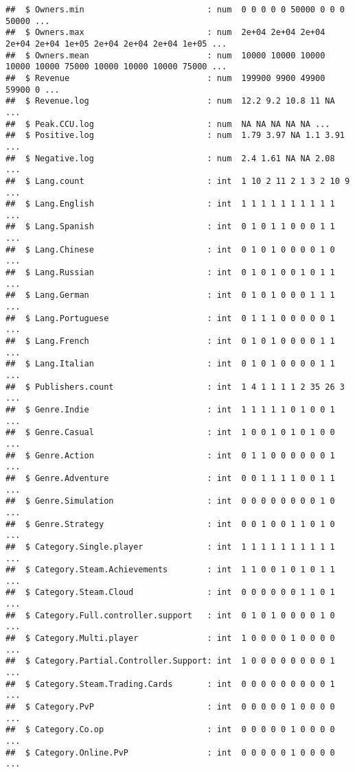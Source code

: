 \documentclass[
]{article}
\begin{document}
\begin{verbatim}
##  $ Owners.min                         : num  0 0 0 0 0 50000 0 0 0 50000 ...
##  $ Owners.max                         : num  2e+04 2e+04 2e+04 2e+04 2e+04 1e+05 2e+04 2e+04 2e+04 1e+05 ...
##  $ Owners.mean                        : num  10000 10000 10000 10000 10000 75000 10000 10000 10000 75000 ...
##  $ Revenue                            : num  199900 9900 49900 59900 0 ...
##  $ Revenue.log                        : num  12.2 9.2 10.8 11 NA ...
##  $ Peak.CCU.log                       : num  NA NA NA NA NA ...
##  $ Positive.log                       : num  1.79 3.97 NA 1.1 3.91 ...
##  $ Negative.log                       : num  2.4 1.61 NA NA 2.08 ...
##  $ Lang.count                         : int  1 10 2 11 2 1 3 2 10 9 ...
##  $ Lang.English                       : int  1 1 1 1 1 1 1 1 1 1 ...
##  $ Lang.Spanish                       : int  0 1 0 1 1 0 0 0 1 1 ...
##  $ Lang.Chinese                       : int  0 1 0 1 0 0 0 0 1 0 ...
##  $ Lang.Russian                       : int  0 1 0 1 0 0 1 0 1 1 ...
##  $ Lang.German                        : int  0 1 0 1 0 0 0 1 1 1 ...
##  $ Lang.Portuguese                    : int  0 1 1 1 0 0 0 0 0 1 ...
##  $ Lang.French                        : int  0 1 0 1 0 0 0 0 1 1 ...
##  $ Lang.Italian                       : int  0 1 0 1 0 0 0 0 1 1 ...
##  $ Publishers.count                   : int  1 4 1 1 1 1 2 35 26 3 ...
##  $ Genre.Indie                        : int  1 1 1 1 1 0 1 0 0 1 ...
##  $ Genre.Casual                       : int  1 0 0 1 0 1 0 1 0 0 ...
##  $ Genre.Action                       : int  0 1 1 0 0 0 0 0 0 1 ...
##  $ Genre.Adventure                    : int  0 0 1 1 1 1 0 0 1 1 ...
##  $ Genre.Simulation                   : int  0 0 0 0 0 0 0 0 1 0 ...
##  $ Genre.Strategy                     : int  0 0 1 0 0 1 1 0 1 0 ...
##  $ Category.Single.player             : int  1 1 1 1 1 1 1 1 1 1 ...
##  $ Category.Steam.Achievements        : int  1 1 0 0 1 0 1 0 1 1 ...
##  $ Category.Steam.Cloud               : int  0 0 0 0 0 0 1 1 0 1 ...
##  $ Category.Full.controller.support   : int  0 1 0 1 0 0 0 0 1 0 ...
##  $ Category.Multi.player              : int  1 0 0 0 0 1 0 0 0 0 ...
##  $ Category.Partial.Controller.Support: int  1 0 0 0 0 0 0 0 0 1 ...
##  $ Category.Steam.Trading.Cards       : int  0 0 0 0 0 0 0 0 0 1 ...
##  $ Category.PvP                       : int  0 0 0 0 0 1 0 0 0 0 ...
##  $ Category.Co.op                     : int  0 0 0 0 0 1 0 0 0 0 ...
##  $ Category.Online.PvP                : int  0 0 0 0 0 1 0 0 0 0 ...
\end{verbatim}
\end{document}
